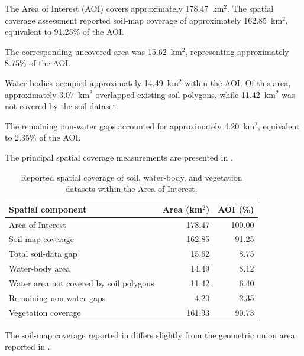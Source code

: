 The Area of Interest (AOI) covers approximately
178.47~km$^2$. The spatial coverage assessment
reported soil-map coverage of approximately
162.85~km$^2$, equivalent to 91.25\% of the AOI.

The corresponding uncovered area was
15.62~km$^2$, representing approximately
8.75\% of the AOI.

Water bodies occupied approximately
14.49~km$^2$ within the AOI. Of this area,
approximately 3.07~km$^2$ overlapped
existing soil polygons, while
11.42~km$^2$ was not covered by the
soil dataset.

The remaining non-water gaps accounted for
approximately 4.20~km$^2$, equivalent
to 2.35\% of the AOI.

The principal spatial coverage measurements
are presented in .

\begin{table}[htbp]
	\centering
	\caption{
		Reported spatial coverage of soil,
		water-body, and vegetation datasets
		within the Area of Interest.
	}
	\label{tab:spatial_coverage}
	
	\begin{tabular}{lrr}
		\hline
		
		\textbf{Spatial component} &
		\textbf{Area (km$^2$)} &
		\textbf{AOI (\%)} \\
		
		\hline
		
		Area of Interest
		& 178.47 & 100.00 \\
		
		Soil-map coverage
		& 162.85 & 91.25 \\
		
		Total soil-data gap
		& 15.62 & 8.75 \\
		
		Water-body area
		& 14.49 & 8.12 \\
		
		Water area not covered by soil polygons
		& 11.42 & 6.40 \\
		
		Remaining non-water gaps
		& 4.20 & 2.35 \\
		
		Vegetation coverage
		& 161.93 & 90.73 \\
		
		\hline
	\end{tabular}
\end{table}

The soil-map coverage reported in
 differs slightly
from the geometric union area reported in
.

